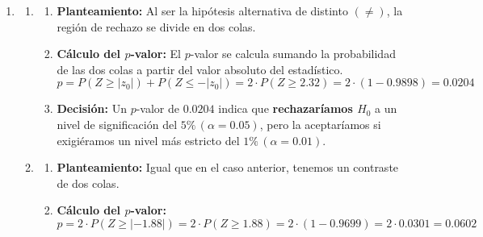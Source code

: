 \begin{enumerate}[label=\color{red}\textbf{\arabic*)}]
\begin{enumerate}[label=\arabic*)]
		            Sustituyendo el estadístico $T$ en la probabilidad calculada en el paso 2: \[
			            P(T>t_{n-1,1-\alpha})
		            \]
		            Por la definición del cuantil $t_{n-1,1-\alpha}$, que deja a su derecha un área igual a $\alpha$, tenemos que: \[
			            P(T>t_{n-1,1-\alpha})=1-(1-\alpha)=\alpha
		            \]
		            Por lo tanto, la extensión del test es, efectivamente, $\alpha$.
	      \end{enumerate}
	\item {}
	      \begin{enumerate}[label=\color{red}\textbf{\alph*)}]
		      \item {}
		            \begin{enumerate}[label=\arabic*)]
			            \item \textbf{Planteamiento:} Al ser la hipótesis alternativa de distinto $(\neq)$, la región de rechazo se divide en dos colas.
			            \item \textbf{Cálculo del $p$-valor:} El $p$-valor se calcula sumando la probabilidad de las dos colas a partir del valor absoluto del estadístico. \[
				                  p=P(Z\ge |z_0|)+P(Z\le -|z_0|)=2\cdot P(Z\ge 2.32)=2\cdot (1-0.9898)=0.0204
			                  \]
			            \item \textbf{Decisión:} Un $p$-valor de $0.0204$ indica que \textbf{rechazaríamos $H_0$} a un nivel de significación del $5\%\,(\alpha=0.05)$, pero la aceptaríamos si exigiéramos un nivel más estricto del $1\%\,(\alpha=0.01)$.
		            \end{enumerate}
		      \item {}
		            \begin{enumerate}[label=\arabic*)]
			            \item \textbf{Planteamiento:} Igual que en el caso anterior, tenemos un contraste de dos colas.
			            \item \textbf{Cálculo del $p$-valor:} \[
				                  p=2\cdot P(Z\ge |-1.88|)=2\cdot P(Z\ge 1.88)=2\cdot (1-0.9699)=2\cdot 0.0301=0.0602
\]
\end{enumerate}
\end{enumerate}
\end{enumerate}
